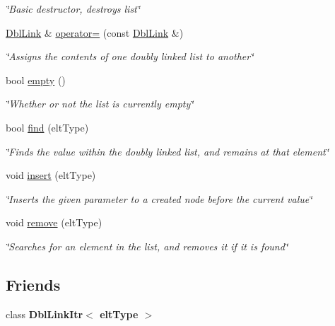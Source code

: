 \begin{DoxyCompactItemize}
\begin{DoxyCompactList}\small\item\em \char`\"{}\-Basic destructor, destroys list\char`\"{} \end{DoxyCompactList}\item 
\hyperlink{classDblLink}{Dbl\-Link} \& \hyperlink{classDblLink_a4ad84478d74adf66e4e8b33a790135b8}{operator=} (const \hyperlink{classDblLink}{Dbl\-Link} \&)
\begin{DoxyCompactList}\small\item\em \char`\"{}\-Assigns the contents of one doubly linked list to another\char`\"{} \end{DoxyCompactList}\item 
bool \hyperlink{classDblLink_a6967117514e7b8372e0b83cd74db0bdc}{empty} ()
\begin{DoxyCompactList}\small\item\em \char`\"{}\-Whether or not the list is currently empty\char`\"{} \end{DoxyCompactList}\item 
bool \hyperlink{classDblLink_a04b7c312227d6eabb96cbe6db17a8645}{find} (elt\-Type)
\begin{DoxyCompactList}\small\item\em \char`\"{}\-Finds the value within the doubly linked list, and remains at that element\char`\"{} \end{DoxyCompactList}\item 
void \hyperlink{classDblLink_a1eea642e9114517a9b8976bec5108612}{insert} (elt\-Type)
\begin{DoxyCompactList}\small\item\em \char`\"{}\-Inserts the given parameter to a created node before the current value\char`\"{} \end{DoxyCompactList}\item 
void \hyperlink{classDblLink_a9dee7a88fd268b8c587a6df95b4eab03}{remove} (elt\-Type)
\begin{DoxyCompactList}\small\item\em \char`\"{}\-Searches for an element in the list, and removes it if it is found\char`\"{} \end{DoxyCompactList}\end{DoxyCompactItemize}
\subsection*{Friends}
\begin{DoxyCompactItemize}
\item 
\hypertarget{classDblLink_a15e9b1e37fae72414617320686b8b4f0}{class {\bfseries Dbl\-Link\-Itr$<$ elt\-Type $>$}}\label{classDblLink_a15e9b1e37fae72414617320686b8b4f0}

\end{DoxyCompactItemize}


